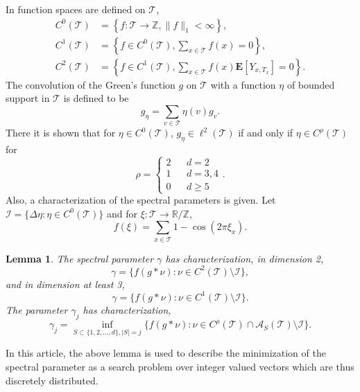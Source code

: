 \documentclass[a4paper, 12pt, notitlepage]{amsart}
\newcommand{\bR}{\mathbb{R}}
\newcommand{\zed}{\mathbb{Z}}
\newcommand{\E}{\mathbf{E}}
\newcommand{\sA}{\mathscr{A}}
\newcommand{\sT}{\mathscr{T}}
\newcommand{\sI}{\mathscr{I}}
\newtheorem{lemma}[theorem]{Lemma}
\theoremstyle{remark}
\begin{document}
In \cite{HS19} function spaces are defined on $\sT$,
\begin{align*}
 C^0(\sT) &= \left\{f: \sT \to \zed, \|f\|_1 < \infty\right\}, \\
 C^1(\sT) &= \left\{f \in C^0(\sT), \sum_{x \in \sT} f(x) = 0\right\},\\
 C^2(\sT) &= \left\{f \in C^1(\sT), \sum_{x \in \sT}f(x) \E[Y_{x, T_x}]=0\right\}.
\end{align*}
The convolution of the Green's function $g$ on $\sT$ with a function $\eta$ of bounded support in $\sT$ is defined to be 
\[
 g_\eta = \sum_{v \in \sT} \eta(v) g_v.
\]
There it is shown that for $\eta \in C^0(\sT)$, $g_\eta \in \ell^2(\sT)$ if and only if $\eta \in C^\rho(\sT)$ for \[\rho = \left\{\begin{array}{lll}2 && d = 2\\ 1 && d=3,4\\ 0 && d \geq 5 \end{array}\right..\]
Also, a characterization of the spectral parameters is given. Let $\sI = \{\Delta \eta: \eta \in C^0(\sT)\}$ and for $\xi : \sT \to \bR/\zed$,
\[
 f(\xi) = \sum_{x \in \sT} 1-\cos(2\pi \xi_x).
\]
\begin{lemma}
 The spectral parameter $\gamma$ has characterization, in dimension 2,
 \begin{equation*}
  \gamma = \{f(g*\nu): \nu \in C^2(\sT) \setminus \sI\},
 \end{equation*}
and in dimension at least 3,
\begin{equation*}
 \gamma = \{f(g*\nu): \nu \in C^1(\sT) \setminus \sI\}.
\end{equation*}
The parameter $\gamma_j$ has characterization,
\begin{equation*}
 \gamma_j = \inf_{S \subset \{1, 2, ..., d\}, |S| = j}\{f(g*\nu): \nu \in C^{\rho}(\sT) \cap \sA_S(\sT) \setminus \sI\}.
\end{equation*}

\end{lemma}
In this article, the above lemma is used to describe the minimization of the spectral parameter as a search problem over integer valued vectors which are thus discretely distributed. 
\end{document}
